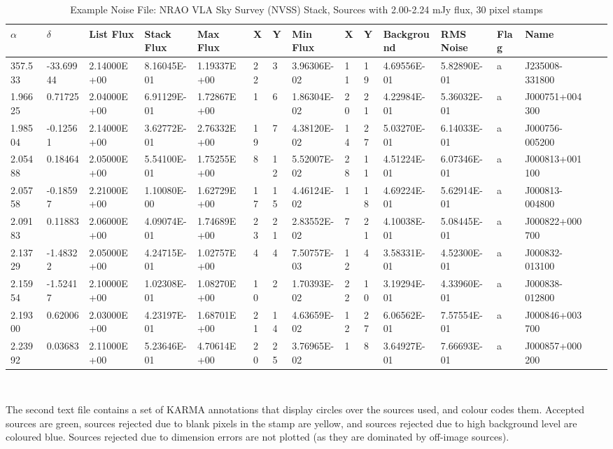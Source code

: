 \documentclass{article}
\begin{document}
\begin{table}
\begin{tabular}{l | l | l | l | l | l | l | l | l | l | l | l | l | l | l | l}
$\alpha$ & $\delta$ & List Flux & Stack Flux & Max Flux & X & Y & Min Flux & X & Y & Background & RMS Noise & Flag & Name \\
\hline
357.533 & -33.69944 & 2.14000E+00 & 8.16045E-01 & 1.19337E+00 & 22 & 3 & 3.96306E-02 & 11 & 19 & 4.69556E-01 & 5.82890E-01 & a & J235008-331800 \\
1.96625 & 0.71725 & 2.04000E+00 & 6.91129E-01 & 1.72867E+00 & 1 & 6 & 1.86304E-02 & 20 & 21 & 4.22984E-01 & 5.36032E-01 & a & J000751+004300 \\
1.98504 & -0.12561 & 2.14000E+00 & 3.62772E-01 & 2.76332E+00 & 19 & 7 & 4.38120E-02 & 14 & 27 & 5.03270E-01 & 6.14033E-01 & a & J000756-005200 \\
2.05488 & 0.18464 & 2.05000E+00 & 5.54100E-01 & 1.75255E+00 & 8 & 12 & 5.52007E-02 & 28 & 11 & 4.51224E-01 & 6.07346E-01 & a & J000813+001100 \\
2.05758 & -0.18597 & 2.21000E+00 & 1.10080E-00 & 1.62729E+00 & 17 & 15 & 4.46124E-02 & 1 & 18 & 4.69224E-01 & 5.62914E-01 & a & J000813-004800 \\
2.09183 & 0.11883 & 2.06000E+00 & 4.09074E-01 & 1.74689E+00 &  23 &  21 & 2.83552E-02 & 7 & 21 & 4.10038E-01 & 5.08445E-01 & a & J000822+000700 \\
2.13729 & -1.48322 & 2.05000E+00 & 4.24715E-01 & 1.02757E+00 & 4 & 4 & 7.50757E-03 & 12 & 4 & 3.58331E-01 & 4.52300E-01 & a & J000832-013100 \\
2.15954 & -1.52417 & 2.10000E+00 & 1.02308E-01 & 1.08270E+00 & 10 & 2 & 1.70393E-02 & 22 & 10 & 3.19294E-01 & 4.33960E-01 & a & J000838-012800 \\
2.19300 & 0.62006 & 2.03000E+00 & 4.23197E-01 & 1.68701E+00 & 21 & 14 & 4.63659E-02 & 12 & 27 & 6.06562E-01 & 7.57554E-01 & a & J000846+003700 \\
2.23992 & 0.03683 & 2.11000E+00 & 5.23646E-01 & 4.70614E+00 & 20 & 25 & 3.76965E-02 & 1 & 8 & 3.64927E-01 & 7.66693E-01 & a & J000857+000200 \\
\end{tabular}\\
\caption[Example Noise File]{Example Noise File: NRAO VLA Sky Survey (NVSS) Stack, Sources with 2.00-2.24 mJy flux, 30 pixel stamps}
\end{table}

\newpage
The second text file contains a set of KARMA annotations that display circles 
over the sources used, and colour codes them.  Accepted sources are green, 
sources rejected due to blank pixels in the stamp are yellow, and sources 
rejected due to high background level are coloured blue. Sources rejected due to
dimension errors are not plotted (as they are dominated by off-image sources).
\end{document}
